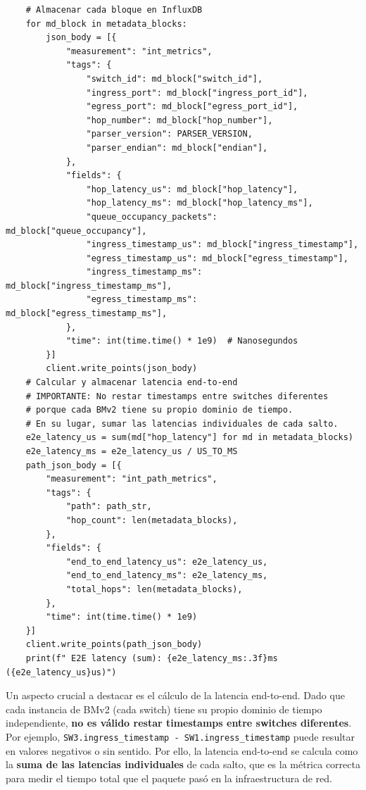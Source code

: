 \begin{lstlisting}
    # Almacenar cada bloque en InfluxDB
    for md_block in metadata_blocks:
        json_body = [{
            "measurement": "int_metrics",
            "tags": {
                "switch_id": md_block["switch_id"],
                "ingress_port": md_block["ingress_port_id"],
                "egress_port": md_block["egress_port_id"],
                "hop_number": md_block["hop_number"],
                "parser_version": PARSER_VERSION,
                "parser_endian": md_block["endian"],
            },
            "fields": {
                "hop_latency_us": md_block["hop_latency"],
                "hop_latency_ms": md_block["hop_latency_ms"],
                "queue_occupancy_packets": md_block["queue_occupancy"],
                "ingress_timestamp_us": md_block["ingress_timestamp"],
                "egress_timestamp_us": md_block["egress_timestamp"],
                "ingress_timestamp_ms": md_block["ingress_timestamp_ms"],
                "egress_timestamp_ms": md_block["egress_timestamp_ms"],
            },
            "time": int(time.time() * 1e9)  # Nanosegundos
        }]
        client.write_points(json_body)
    # Calcular y almacenar latencia end-to-end
    # IMPORTANTE: No restar timestamps entre switches diferentes
    # porque cada BMv2 tiene su propio dominio de tiempo.
    # En su lugar, sumar las latencias individuales de cada salto.
    e2e_latency_us = sum(md["hop_latency"] for md in metadata_blocks)
    e2e_latency_ms = e2e_latency_us / US_TO_MS
    path_json_body = [{
        "measurement": "int_path_metrics",
        "tags": {
            "path": path_str,
            "hop_count": len(metadata_blocks),
        },
        "fields": {
            "end_to_end_latency_us": e2e_latency_us,
            "end_to_end_latency_ms": e2e_latency_ms,
            "total_hops": len(metadata_blocks),
        },
        "time": int(time.time() * 1e9)
    }]
    client.write_points(path_json_body)
    print(f" E2E latency (sum): {e2e_latency_ms:.3f}ms ({e2e_latency_us}us)")
\end{lstlisting}

Un aspecto crucial a destacar es el cálculo de la latencia end-to-end. Dado que cada instancia de BMv2 (cada switch) tiene su propio dominio de tiempo independiente, \textbf{no es válido restar timestamps entre switches diferentes}. Por ejemplo, \texttt{SW3.ingress\_timestamp - SW1.ingress\_timestamp} puede resultar en valores negativos o sin sentido. Por ello, la latencia end-to-end se calcula como la \textbf{suma de las latencias individuales} de cada salto, que es la métrica correcta para medir el tiempo total que el paquete pasó en la infraestructura de red.

